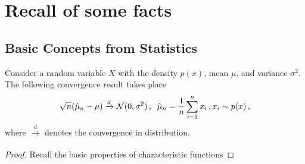 \section{Recall of some facts}

\subsection{Basic Concepts from Statistics}

\begin{theorem}
    Consider a random variable $X$ with the density $p(x)$, mean $\mu$, and variance $\sigma^2$. The following convergence result takes place
    \begin{align}
        \sqrt{n}(\hat{\mu}_n-\mu) \xrightarrow[]{d} \mathcal{N}(0,\sigma^2)\,, \;\; \hat{\mu}_n = \frac{1}{n}\sum_{i=1}^n x_i\,, x_i \sim p(x)\,,
    \end{align}
    where $\xrightarrow[]{d}$ denotes the convergence in distribution.
\end{theorem}
\begin{proof}
    Recall the basic properties of characteristic functions
\end{proof}




